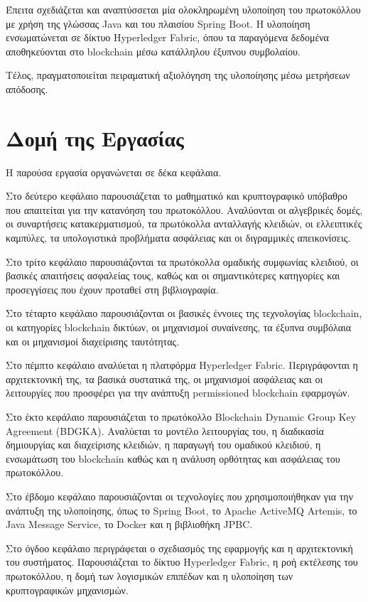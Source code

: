 \documentclass[12pt,a4paper]{report}
\begin{document}
Έπειτα σχεδιάζεται και αναπτύσσεται μία ολοκληρωμένη υλοποίηση του πρωτοκόλλου με χρήση της γλώσσας Java και του πλαισίου Spring Boot. Η υλοποίηση ενσωματώνεται σε δίκτυο Hyperledger Fabric, όπου τα παραγόμενα δεδομένα αποθηκεύονται στο blockchain μέσω κατάλληλου έξυπνου συμβολαίου.

Τέλος, πραγματοποιείται πειραματική αξιολόγηση της υλοποίησης μέσω μετρήσεων απόδοσης. 

\section{Δομή της Εργασίας}

Η παρούσα εργασία οργανώνεται σε δέκα κεφάλαια.

Στο δεύτερο κεφάλαιο παρουσιάζεται το μαθηματικό και κρυπτογραφικό υπόβαθρο που απαιτείται για την κατανόηση του πρωτοκόλλου. Αναλύονται οι αλγεβρικές δομές, οι συναρτήσεις κατακερματισμού, τα πρωτόκολλα ανταλλαγής κλειδιών, οι ελλειπτικές καμπύλες, τα υπολογιστικά προβλήματα ασφάλειας και οι διγραμμικές απεικονίσεις.

Στο τρίτο κεφάλαιο παρουσιάζονται τα πρωτόκολλα ομαδικής συμφωνίας κλειδιού, οι βασικές απαιτήσεις ασφαλείας τους, καθώς και οι σημαντικότερες κατηγορίες και προσεγγίσεις που έχουν προταθεί στη βιβλιογραφία.

Στο τέταρτο κεφάλαιο παρουσιάζονται οι βασικές έννοιες της τεχνολογίας blockchain, οι κατηγορίες blockchain δικτύων, οι μηχανισμοί συναίνεσης, τα έξυπνα συμβόλαια και οι μηχανισμοί διαχείρισης ταυτότητας.

Στο πέμπτο κεφάλαιο αναλύεται η πλατφόρμα Hyperledger Fabric. Περιγράφονται η αρχιτεκτονική της, τα βασικά συστατικά της, οι μηχανισμοί ασφάλειας και οι λειτουργίες που προσφέρει για την ανάπτυξη permissioned blockchain εφαρμογών.

Στο έκτο κεφάλαιο παρουσιάζεται το πρωτόκολλο Blockchain Dynamic Group Key Agreement (BDGKA). Αναλύεται το μοντέλο λειτουργίας του, η διαδικασία δημιουργίας και διαχείρισης κλειδιών, η παραγωγή του ομαδικού κλειδιού, η ενσωμάτωση του blockchain καθώς και η ανάλυση ορθότητας και ασφάλειας του πρωτοκόλλου.

Στο έβδομο κεφάλαιο παρουσιάζονται οι τεχνολογίες που χρησιμοποιήθηκαν για την ανάπτυξη της υλοποίησης, όπως το Spring Boot, το Apache ActiveMQ Artemis, το Java Message Service, το Docker και η βιβλιοθήκη JPBC.

Στο όγδοο κεφάλαιο περιγράφεται ο σχεδιασμός της εφαρμογής και η αρχιτεκτονική του συστήματος. Παρουσιάζεται το δίκτυο Hyperledger Fabric, η ροή εκτέλεσης του πρωτοκόλλου, η δομή των λογισμικών επιπέδων και η υλοποίηση των κρυπτογραφικών μηχανισμών.
\end{document}
